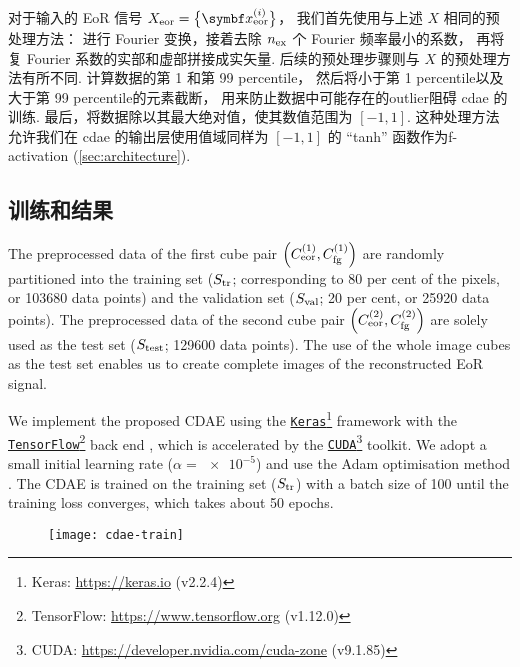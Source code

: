 对于输入的 EoR 信号 $X_{\R{eor}} = \big\{ \B{x}^{(i)}_{\R{eor}} \big\}$，
我们首先使用与上述 $X$ 相同的预处理方法：
进行 Fourier 变换，接着去除 $n_{\mathrm{ex}}$ 个 Fourier 频率最小的系数，
再将复 Fourier 系数的实部和虚部拼接成实矢量.
后续的预处理步骤则与 $X$ 的预处理方法有所不同.
计算数据的第 1 和第 99 \ac{percentile}，
然后将小于第 1 \ac{percentile}以及大于第 99 \ac{percentile}的元素截断，
用来防止数据中可能存在的\ac{outlier}阻碍 \ac{cdae} 的训练.
最后，将数据除以其最大绝对值，使其数值范围为 $[-1, 1]$.
这种处理方法允许我们在 \ac{cdae} 的输出层使用值域同样为 $[-1, 1]$
的 \enquote{tanh} 函数作为\ac{f-activation} (\autoref{sec:architecture}).

\subsection{训练和结果}
\label{sec:cdae-results}

The preprocessed data of the first cube pair
$\left( C_{\mathrm{eor}}^{(1)}, C_{\mathrm{fg}}^{(1)} \right)$
are randomly partitioned into the training set ($S_{\mathrm{tr}}$; corresponding
to 80 per cent of the pixels, or \num{103680} data points) and the
validation set ($S_{\mathrm{val}}$; 20 per cent, or \num{25920} data points).
The preprocessed data of the second cube pair
$\left( C_{\mathrm{eor}}^{(2)}, C_{\mathrm{fg}}^{(2)} \right)$
are solely used as the test set ($S_{\mathrm{test}}$; \num{129600} data points).
The use of the whole image cubes as the test set enables us to create
complete images of the reconstructed EoR signal.

We implement the proposed CDAE using the
\href{https://keras.io}{\texttt{Keras}}\footnote{%
  Keras: \url{https://keras.io} (v2.2.4)}
framework \cite{keras} with the
\href{https://www.tensorflow.org}{\texttt{TensorFlow}}\footnote{%
  TensorFlow: \url{https://www.tensorflow.org} (v1.12.0)}
back end \cite{tensorflow},
which is accelerated by the
\href{https://developer.nvidia.com/cuda-zone}{\texttt{CUDA}}\footnote{%
  CUDA: \url{https://developer.nvidia.com/cuda-zone} (v9.1.85)}
toolkit.
We adopt a small initial learning rate ($\alpha = \num{e-5}$) and use the
Adam optimisation method \cite{kingma2015}.
The CDAE is trained on the training set ($S_{\mathrm{tr}}$) with a batch size of
100 until the training loss converges, which takes about 50 epochs.

\begin{figure}[htp]
  \centering
  \texttt{[image: cdae-train]}
  \label{fig:cdae-train}
\end{figure}

